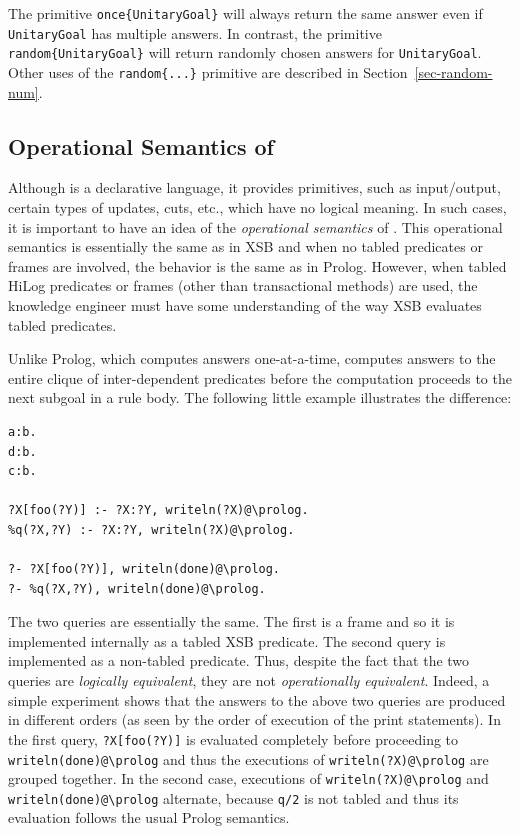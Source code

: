 \documentclass[11pt]{article}
\newcommand{\ERGO}{\mbox{\smaller{\ensuremath{\cal{E}}\smaller{{\sc{RGO}}}}}\xspace}
\newcommand{\FLSYSTEM}{\ERGO}
\newcommand{\bs}{\textbackslash}
\begin{document}
The primitive \texttt{once\{UnitaryGoal\}}
will always return the same answer
even if  \texttt{UnitaryGoal} has multiple answers.
In contrast, the primitive \texttt{random\{UnitaryGoal\}}
will return randomly chosen answers for \texttt{UnitaryGoal}. 
Other uses of the \texttt{random\{...\}} primitive are described in
Section~\ref{sec-random-num}. 



\subsection{Operational Semantics of \FLSYSTEM}\label{sec-flora-operational}

Although \FLSYSTEM is a declarative language, it provides primitives, such as
input/output, certain types of updates, cuts, etc., which have no logical
meaning. In such cases, it is important to have an idea of the
\emph{operational semantics} of \FLSYSTEM. This operational semantics is
essentially the same as in XSB and when no tabled predicates or frames
are involved, the behavior is the same as in Prolog. However, when tabled
HiLog predicates or frames (other than transactional methods) are used,
the knowledge engineer must have some understanding of the way XSB evaluates tabled
predicates.

Unlike Prolog, which computes answers one-at-a-time, \FLSYSTEM computes
answers to the entire clique of inter-dependent
predicates before the computation proceeds to the next subgoal
in a rule body. The following little example illustrates the difference:
\begin{verbatim}
a:b.
d:b.
c:b.

?X[foo(?Y)] :- ?X:?Y, writeln(?X)@\prolog.
%q(?X,?Y) :- ?X:?Y, writeln(?X)@\prolog.

?- ?X[foo(?Y)], writeln(done)@\prolog.
?- %q(?X,?Y), writeln(done)@\prolog.
\end{verbatim}
The two queries are essentially the same. The first is a frame
and so it is implemented internally as a tabled XSB predicate. The
second query is implemented as a non-tabled predicate.  Thus, despite
the fact that the two queries are \emph{logically equivalent}, they are
not \emph{operationally equivalent}.  Indeed, a
simple experiment shows that the answers to the above two queries are
produced in different orders (as seen by the order of execution of the
print statements).  In the first query, \verb|?X[foo(?Y)]| is evaluated
completely before proceeding to {\tt writeln(done)@\bs{}prolog} and thus
the executions of {\tt writeln(?X)@\bs{}prolog} are grouped together. In the
second case, executions of {\tt writeln(?X)@\bs{}prolog} and {\tt
writeln(done)@\bs{}prolog} alternate, because {\tt \verb|q|/2} is not tabled
and thus its evaluation follows the usual Prolog semantics.
\end{document}
